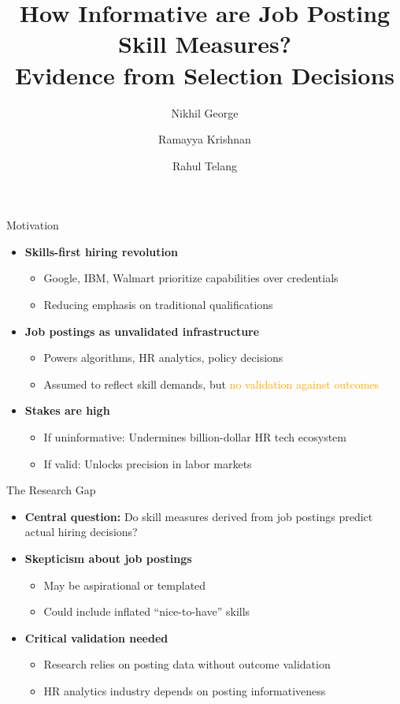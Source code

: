 \documentclass{beamer}
\title[Job Posting Skill Measures]{How Informative are Job Posting Skill Measures?\\Evidence from Selection Decisions}
\author{Nikhil George \and Ramayya Krishnan \and Rahul Telang}
\institute{Carnegie Mellon University}
\date{}
\begin{document}
\begin{frame}
\titlepage
\end{frame}

\begin{frame}{Motivation}
\begin{itemize}
    \item \textbf{Skills-first hiring revolution}
    \begin{itemize}
        \item Google, IBM, Walmart prioritize capabilities over credentials
        \item Reducing emphasis on traditional qualifications
    \end{itemize}
    \item \textbf{Job postings as unvalidated infrastructure}
    \begin{itemize}
        \item Powers algorithms, HR analytics, policy decisions
        \item Assumed to reflect skill demands, but \textcolor{orange}{no validation against outcomes}
    \end{itemize}
    \item \textbf{Stakes are high}
    \begin{itemize}
        \item If uninformative: Undermines billion-dollar HR tech ecosystem
        \item If valid: Unlocks precision in labor markets
    \end{itemize}
\end{itemize}
\end{frame}

\begin{frame}{The Research Gap}
\begin{itemize}
    \item \textbf{Central question:} Do skill measures derived from job postings predict actual hiring decisions?
    \item \textbf{Skepticism about job postings}
    \begin{itemize}
        \item May be aspirational or templated
        \item Could include inflated ``nice-to-have'' skills
    \end{itemize}
    \item \textbf{Critical validation needed}
    \begin{itemize}
        \item Research relies on posting data without outcome validation
        \item HR analytics industry depends on posting informativeness
    \end{itemize}
\end{itemize}
\end{frame}
\end{document}

